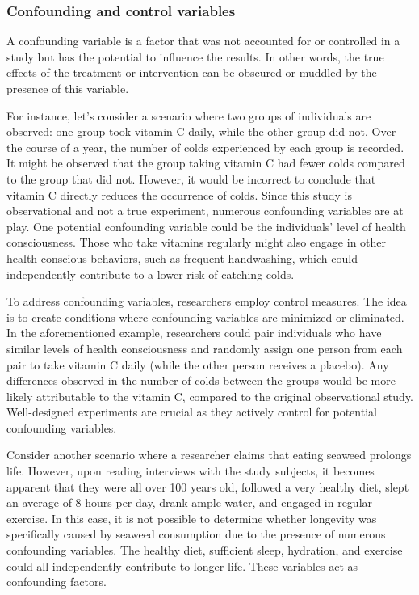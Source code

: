 \documentclass[
  12pt,
  oneside]{book}
\theoremstyle{definition}
\theoremstyle{definition}
\theoremstyle{definition}
\theoremstyle{definition}
\theoremstyle{remark}
\begin{document}
\hypertarget{confounding-and-control-variables}{%
\subsubsection{Confounding and control variables}\label{confounding-and-control-variables}}

A confounding variable is a factor that was not accounted for or controlled in a study but has the potential to influence the results. In other words, the true effects of the treatment or intervention can be obscured or muddled by the presence of this variable.

For instance, let's consider a scenario where two groups of individuals are observed: one group took vitamin C daily, while the other group did not. Over the course of a year, the number of colds experienced by each group is recorded. It might be observed that the group taking vitamin C had fewer colds compared to the group that did not. However, it would be incorrect to conclude that vitamin C directly reduces the occurrence of colds. Since this study is observational and not a true experiment, numerous confounding variables are at play. One potential confounding variable could be the individuals' level of health consciousness. Those who take vitamins regularly might also engage in other health-conscious behaviors, such as frequent handwashing, which could independently contribute to a lower risk of catching colds.

To address confounding variables, researchers employ control measures. The idea is to create conditions where confounding variables are minimized or eliminated. In the aforementioned example, researchers could pair individuals who have similar levels of health consciousness and randomly assign one person from each pair to take vitamin C daily (while the other person receives a placebo). Any differences observed in the number of colds between the groups would be more likely attributable to the vitamin C, compared to the original observational study. Well-designed experiments are crucial as they actively control for potential confounding variables.

Consider another scenario where a researcher claims that eating seaweed prolongs life. However, upon reading interviews with the study subjects, it becomes apparent that they were all over 100 years old, followed a very healthy diet, slept an average of 8 hours per day, drank ample water, and engaged in regular exercise. In this case, it is not possible to determine whether longevity was specifically caused by seaweed consumption due to the presence of numerous confounding variables. The healthy diet, sufficient sleep, hydration, and exercise could all independently contribute to longer life. These variables act as confounding factors.
\end{document}

